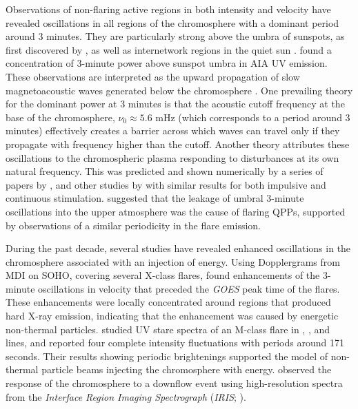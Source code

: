 Observations of non-flaring active regions
in both intensity and velocity
have revealed oscillations in all regions of the chromosphere
with a dominant period around 3 minutes.
They are particularly strong above the umbra of sunspots,
as first discovered by \cite{Beckers1969}, as well as
internetwork regions in the quiet sun \citep{Orrall1966}.
\cite{Reznikova2012} found a concentration of 3-minute power
above sunspot umbra in AIA UV emission.
These observations are interpreted as the upward propagation of
slow magnetoacoustic waves generated below the chromosphere
\citep{Brynildsen2004}.
One prevailing theory for the dominant power at 3 minutes is that
the acoustic cutoff frequency at the base of the chromosphere,
$\nu_{0} \approx 5.6$ mHz
(which corresponds to a period around 3 minutes)
effectively creates a barrier across which waves can travel
only if they propagate with frequency higher than the cutoff.
Another theory attributes these oscillations to
the chromospheric plasma responding to disturbances
at its own natural frequency.
This was predicted and shown numerically by
a series of papers by \cite{Sutmann1995a,Sutmann1995b,Sutmann1998},
and other studies by \cite{Chae2015}
with similar results for both impulsive and continuous stimulation.
\cite{Sych2009} suggested that the leakage of umbral 3-minute oscillations
into the upper atmosphere was the cause of flaring QPPs, supported by
observations of a similar periodicity in the flare emission.


During the past decade, several studies have revealed enhanced oscillations
in the chromosphere associated with an injection of energy.
Using Dopplergrams from MDI on SOHO,
covering several X-class flares,
\cite{Kumar2006}
found enhancements of the 3-minute oscillations in velocity
that preceded the \textit{GOES} peak time of the flares.
These enhancements were locally concentrated around regions that
produced hard X-ray emission, indicating
that the enhancement was caused by energetic non-thermal particles.
\cite{Brosius2015} studied UV stare spectra of an M-class flare
in , , and  lines,
and reported four complete intensity fluctuations with periods
around 171 seconds.
Their results showing periodic brightenings supported the
model of non-thermal particle beams injecting the chromosphere
with energy.
\cite{Kwak2016} observed
the response of the chromosphere to a downflow event
using high-resolution spectra from the
\textit{Interface Region Imaging Spectrograph}
(\textit{IRIS}; \cite{DePontieu2014}).

